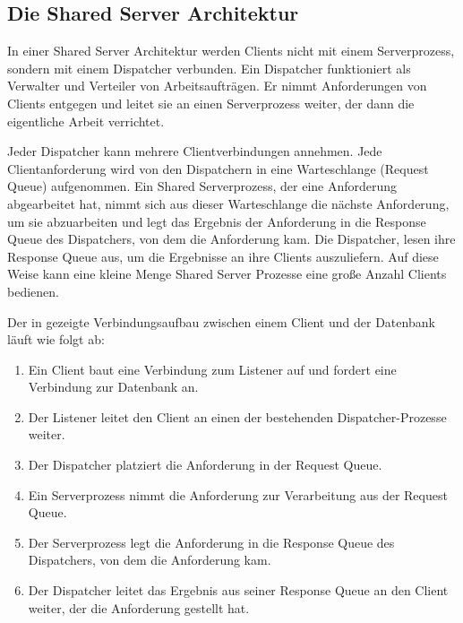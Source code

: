       \subsection{Die Shared Server Architektur}
        In einer Shared Server Architektur werden Clients nicht mit einem Serverprozess, sondern mit einem Dispatcher verbunden. Ein Dispatcher funktioniert als Verwalter und Verteiler von Arbeitsauftr\"agen. Er nimmt Anforderungen von Clients entgegen und leitet sie an einen Serverprozess weiter, der dann die eigentliche Arbeit verrichtet.


        Jeder Dispatcher kann mehrere Clientverbindungen annehmen. Jede Clientanforderung wird von den Dispatchern in eine Warteschlange (Request Queue) aufgenommen. Ein Shared Serverprozess, der eine Anforderung abgearbeitet hat, nimmt sich aus dieser Warteschlange die n\"achste Anforderung, um sie abzuarbeiten und legt das Ergebnis der Anforderung in die Response Queue des Dispatchers, von dem die Anforderung kam. Die Dispatcher, lesen ihre Response Queue aus, um die Ergebnisse an ihre Clients auszuliefern. Auf diese Weise kann eine kleine Menge Shared Server Prozesse eine gro\ss e Anzahl Clients bedienen.

        Der in  gezeigte Verbindungsaufbau zwischen einem Client und der Datenbank l\"auft wie folgt ab:
\clearpage
          \begin{enumerate}
            \item Ein Client baut eine Verbindung zum Listener auf und fordert eine Verbindung zur Datenbank an.
            \item Der Listener leitet den Client an einen der bestehenden Dispatcher-Prozesse weiter.
            \item Der Dispatcher platziert die Anforderung in der Request Queue.
            \item Ein Serverprozess nimmt die Anforderung zur Verarbeitung aus der Request Queue.
            \item Der Serverprozess legt die Anforderung in die Response Queue des Dispatchers, von dem die Anforderung kam.
            \item Der Dispatcher leitet das Ergebnis aus seiner Response Queue an den Client weiter, der die Anforderung gestellt hat.
          \end{enumerate}
